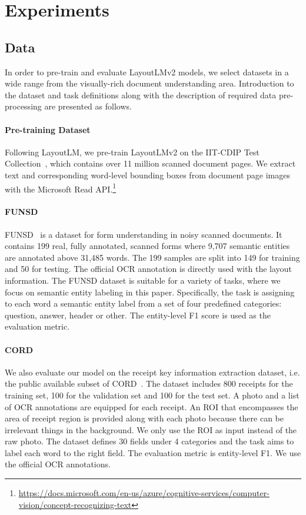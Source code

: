 \documentclass{article} \usepackage{iclr2021_conference,times}
\begin{document}
\section{Experiments}

\subsection{Data}

In order to pre-train and evaluate LayoutLMv2 models, we select datasets in a wide range from the visually-rich document understanding area. Introduction to the dataset and task definitions along with the description of required data pre-processing are presented as follows.

\paragraph{Pre-training Dataset}

Following LayoutLM, we pre-train LayoutLMv2 on the IIT-CDIP Test Collection~\citep{10.1145/1148170.1148307}, which contains over 11 million scanned document pages. We extract text and corresponding word-level bounding boxes from document page images with the Microsoft Read API.\footnote{\scriptsize \url{https://docs.microsoft.com/en-us/azure/cognitive-services/computer-vision/concept-recognizing-text}}


\paragraph{FUNSD}

FUNSD~\citep{Jaume_2019} is a dataset for form understanding in noisy scanned documents. It contains 199 real, fully annotated, scanned forms where 9,707 semantic entities are annotated above 31,485 words. The 199 samples are split into 149 for training and 50 for testing. The official OCR annotation is directly used with the layout information. The FUNSD dataset is suitable for a variety of tasks, where we focus on semantic entity labeling in this paper. Specifically, the task is assigning to each word a semantic entity label from a set of four predefined categories: question, answer, header or other. The entity-level F1 score is used as the evaluation metric.

\paragraph{CORD}

We also evaluate our model on the receipt key information extraction dataset, i.e. the public available subset of CORD~\citep{park2019cord}. The dataset includes 800 receipts for the training set, 100 for the validation set and 100 for the test set. A photo and a list of OCR annotations are equipped for each receipt. An ROI that encompasses the area of receipt region is provided along with each photo because there can be irrelevant things in the background. We only use the ROI as input instead of the raw photo. The dataset defines 30 fields under 4 categories and the task aims to label each word to the right field. The evaluation metric is entity-level F1. We use the official OCR annotations.
\end{document}
